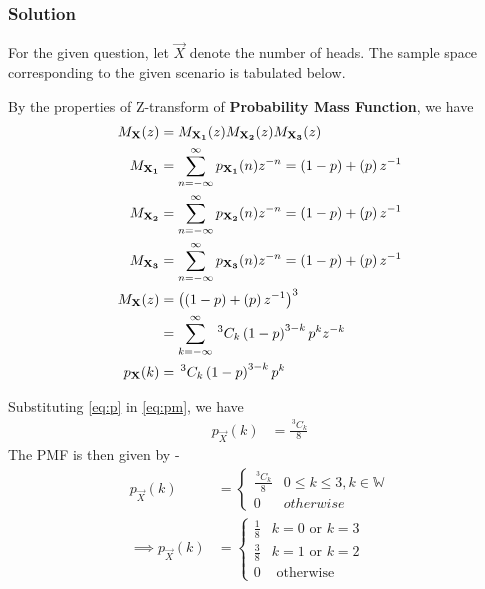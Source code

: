 \documentclass{beamer}
\newcommand{\nCr}[2]{\,^{#1}C_{#2}}
\begin{document}
\begin{frame}
\frametitle{Solution}
For the given question, let $\vec{X}$ denote the number of heads. The sample space corresponding to the given scenario is tabulated below. \\


\end{frame}

\begin{frame}
By the properties of Z-transform of \textbf{Probability Mass Function}, we have
\begin{align}
	M_{\vec{X}} (z) &= M_{\vec{X_{1}}} (z) M_{\vec{X_{2}}} (z) M_{\vec{X_{3}}} (z) \\
	M_{\vec{X_{1}}} &= \sum_{n = - \infty}^{\infty} p_{\vec{X_{1}}} (n) z^{-n} = (1 - p) + \brak{p}z^{-1} \\
	M_{\vec{X_{2}}} &= \sum_{n = - \infty}^{\infty} p_{\vec{X_{2}}} (n) z^{-n} = (1 - p) + \brak{p}z^{-1} \\
	M_{\vec{X_{3}}} &= \sum_{n = - \infty}^{\infty} p_{\vec{X_{3}}} (n) z^{-n} = (1 - p) + \brak{p}z^{-1} \\
	M_{\vec{X}} (z) &= \brak{(1 - p) + \brak{p}z^{-1}}^3 \\
	                &= \sum_{k = -\infty}^{\infty} \nCr{3}{k} \brak{1-p}^{3-k} p^{k} z^{-k} \\
	p_{\vec{X}} (k) &= \nCr{3}{k} \brak{1-p}^{3-k} p^{k} \label{eq:pm}
\end{align}

\end{frame}

\begin{frame}
Substituting \eqref{eq:p} in \eqref{eq:pm}, we have
\begin{align}
	p_{\vec{X}} (k) &= \frac{\nCr{3}{k}}{8} \label{eq:pmf}
\end{align}
The PMF is then given by - 
\begin{align}
p_{\vec{X}} (k) &= 
\begin{cases}
	\frac{\nCr{3}{k}}{8} & 0 \leq k \leq 3, k \in \mathbb{W} \\
	0 & otherwise
\end{cases} \\
\implies p_{\vec{X}} (k) &= 
\begin{cases}
	\frac{1}{8} & k = 0 \text{ or }  k = 3\\
	\frac{3}{8} & k = 1 \text{ or } k = 2\\
	0 & \text{ otherwise }
\end{cases}
\end{align}
\end{frame}
\end{document}
